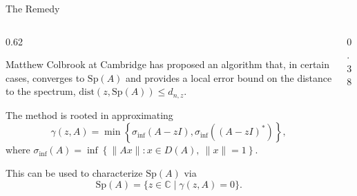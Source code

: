 \documentclass[aspectratio=169]{beamer}
\begin{document}
\begin{frame}{The Remedy}

    \begin{columns}[T]

    \begin{column}{0.62\textwidth}

    Matthew Colbrook at Cambridge has proposed an algorithm that, in certain cases, converges to $\text{Sp}(A)$ and provides a local error bound on the distance to the spectrum, $ \text{dist}(z, \text{Sp}(A)) \le d_{n,z}.$ 

    \vspace{1em}

    The method is rooted in approximating
    $$  \gamma(z,A)=\min\left\{
\sigma_{\inf}(A-zI),
\sigma_{\inf}\left((A-zI)^*\right)
\right\},$$
where $\sigma_{\inf}(A) = 
\inf\left\{
\|Ax\| : x \in D(A),\ \|x\|=1
\right\}.$

 \vspace{1em}
This can be used to characterize $\text{Sp}(A)$ via
$$ \text{Sp}(A) = \{ z \in \mathbb{C} \mid \gamma(z, A) = 0 \}.$$

\end{column}
\begin{column}{0.38\textwidth}

\begin{center}


\end{center}
\end{column}
\end{columns}
\end{frame}
\end{document}
